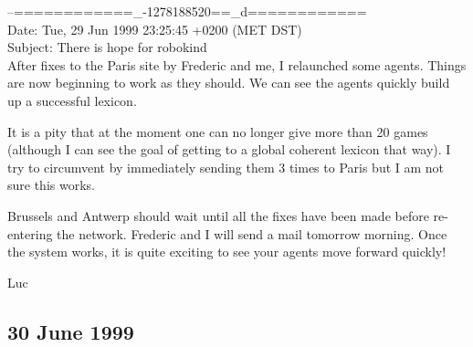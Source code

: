 \begin{mail}
--============\_-1278188520==\_d============\\
Date: Tue, 29 Jun 1999 23:25:45 +0200 (MET DST)\\
Subject: There is hope for robokind \\

After fixes to the Paris site by Frederic and me, I relaunched some agents. 
Things are now beginning to work as they should. We can see the
agents quickly build up a successful lexicon.

It is a pity that at the moment one can no longer give more 
than 20 games (although I can see the goal of getting to a global 
coherent lexicon that way). I try to circumvent by immediately
sending them 3 times to Paris but I am not sure this works.

Brussels and Antwerp should wait until all the fixes have been made 
before re-entering the network. Frederic and I will send a mail tomorrow
morning. Once the system works, it is quite exciting to see your agents move 
forward quickly!

Luc
\end{mail}

\subsection*{30 June 1999} 


